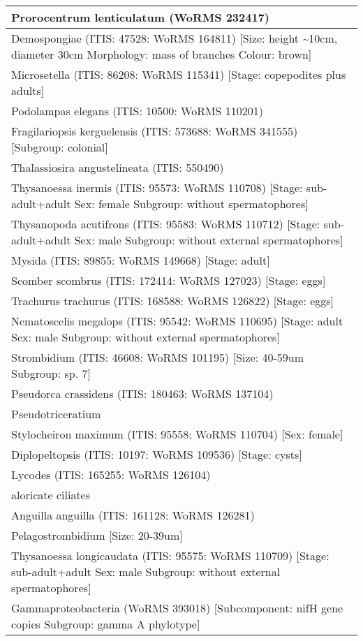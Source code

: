 \documentclass[
]{book}
\begin{document}
\begin{tabular}[t]{l}
\hline
Prorocentrum lenticulatum (WoRMS 232417)\\
\hline
Demospongiae (ITIS: 47528: WoRMS 164811) [Size: height \textasciitilde{}10cm, diameter 30cm Morphology: mass of branches Colour: brown]\\
\hline
Microsetella (ITIS: 86208: WoRMS 115341) [Stage: copepodites plus adults]\\
\hline
Podolampas elegans (ITIS: 10500: WoRMS 110201)\\
\hline
Fragilariopsis kerguelensis (ITIS: 573688: WoRMS 341555) [Subgroup: colonial]\\
\hline
Thalassiosira angustelineata (ITIS: 550490)\\
\hline
Thysanoessa inermis (ITIS: 95573: WoRMS 110708) [Stage: sub-adult+adult Sex: female Subgroup: without spermatophores]\\
\hline
Thysanopoda acutifrons (ITIS: 95583: WoRMS 110712) [Stage: sub-adult+adult Sex: male Subgroup: without external spermatophores]\\
\hline
Mysida (ITIS: 89855: WoRMS 149668) [Stage: adult]\\
\hline
Scomber scombrus (ITIS: 172414: WoRMS 127023) [Stage: eggs]\\
\hline
Trachurus trachurus (ITIS: 168588: WoRMS 126822) [Stage: eggs]\\
\hline
Nematoscelis megalops (ITIS: 95542: WoRMS 110695) [Stage: adult Sex: male Subgroup: without external spermatophores]\\
\hline
Strombidium (ITIS: 46608: WoRMS 101195) [Size: 40-59um Subgroup: sp. 7]\\
\hline
Pseudorca crassidens (ITIS: 180463: WoRMS 137104)\\
\hline
Pseudotriceratium\\
\hline
Stylocheiron maximum (ITIS: 95558: WoRMS 110704) [Sex: female]\\
\hline
Diplopeltopsis (ITIS: 10197: WoRMS 109536) [Stage: cysts]\\
\hline
Lycodes (ITIS: 165255: WoRMS 126104)\\
\hline
aloricate ciliates\\
\hline
Anguilla anguilla (ITIS: 161128: WoRMS 126281)\\
\hline
Pelagostrombidium [Size: 20-39um]\\
\hline
Thysanoessa longicaudata (ITIS: 95575: WoRMS 110709) [Stage: sub-adult+adult Sex: male Subgroup: without external spermatophores]\\
\hline
Gammaproteobacteria (WoRMS 393018) [Subcomponent: nifH gene copies Subgroup: gamma A phylotype]\\

\end{tabular}
\end{document}
